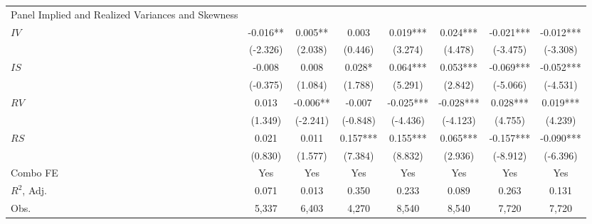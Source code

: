 \begin{tabular}{lccccccc}
Panel Implied and Realized Variances and Skewness &  &  &  &  &  &  &  \\
$IV$ & -0.016** & 0.005** & 0.003 & 0.019*** & 0.024*** & -0.021*** & -0.012*** \\
 & (-2.326) & (2.038) & (0.446) & (3.274) & (4.478) & (-3.475) & (-3.308) \\
$IS$ & -0.008 & 0.008 & 0.028* & 0.064*** & 0.053*** & -0.069*** & -0.052*** \\
 & (-0.375) & (1.084) & (1.788) & (5.291) & (2.842) & (-5.066) & (-4.531) \\
$RV$ & 0.013 & -0.006** & -0.007 & -0.025*** & -0.028*** & 0.028*** & 0.019*** \\
 & (1.349) & (-2.241) & (-0.848) & (-4.436) & (-4.123) & (4.755) & (4.239) \\
$RS$ & 0.021 & 0.011 & 0.157*** & 0.155*** & 0.065*** & -0.157*** & -0.090*** \\
 & (0.830) & (1.577) & (7.384) & (8.832) & (2.936) & (-8.912) & (-6.396) \\
Combo FE & Yes & Yes & Yes & Yes & Yes & Yes & Yes \\
$R^2$,  Adj. & 0.071 & 0.013 & 0.350 & 0.233 & 0.089 & 0.263 & 0.131 \\
Obs. & 5,337 & 6,403 & 4,270 & 8,540 & 8,540 & 7,720 & 7,720 \\
\bottomrule
\end{tabular}
